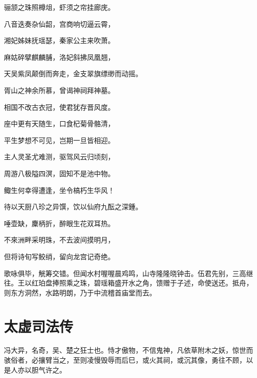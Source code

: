 \documentclass[a4paper,12pt,UTF8,twoside]{ctexbook}
\begin{document}
骊颔之珠照樽俎，虾须之帘挂廊庑。

八音迭奏杂仙韶，宫商响切逼云霄，

湘妃姊妹抚瑶瑟，秦家公主来吹萧。

麻姑碎擘麒麟脯，洛妃斜拂凤凰翘，

天吴紫凤颠倒而奔走，金支翠旗缥缈而动摇。

胥山之神余所慕，曾谒神祠拜神墓。

相国不改古衣冠，使君犹存晋风度。

座中更有天随生，口食杞菊骨骼清，

平生梦想不可见，岂期一旦皆相迎。

主人灵圣尤难测，驱驾风云归顷刻，

周游八极隘四溟，固知不是池中物。

鲰生何幸得遭逢，坐令槁朽生华风！

待以天厨八珍之异馔，饮以仙府九酝之深鍾。

唾壶缺，麇柄折，醉眼生花双耳热。

不來洲畔采明珠，不去波间摸明月，

但将诗旬写鲛绡，留向龙宫记奇绝。

歌咏俱毕，觥筹交错。但闻水村喔喔晨鸡鸣，山寺隆隆晓钟击。伍君先别，三高继往。王以红珀盘捧照乘之珠，碧瑶箱盛开水之角，馈赠于子述，命使送还。抵舟，则东方洞然，水路明朗，乃于中流稽首庙堂而去。

\chapter{太虚司法传}

冯大异，名奇，吴、楚之狂士也。恃才傲物，不信鬼神，凡依草附木之妖，惊世而骇俗者，必攘臂当之，至则凌慢毁辱而后巳，或火其祠，或沉其像，勇往不顾，以是人亦以胆气许之。
\end{document}
